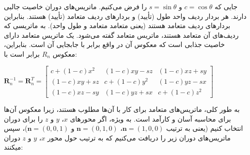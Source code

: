 {\begin{spacing}{1.5}
        جایی که $c=\cos\theta$ و $s=\sin\theta$ را فرض می‌کنیم.
        ماتریس‌های دوران خاصیت جالبی دارند. هر بردار ردیف واحد طول (تأیید) و بردارهای ردیف متعامد (تأیید) هستند.
        بنابراین بردارهای ردیف متعامد هستند (یعنی متعامد متعامد و طول واحد).
        به ماتریسی که ردیف‌های آن متعامد هستند، ماتریس متعامد گفته می‌شود.
        یک ماتریس متعامد دارای خاصیت جذابی است که معکوس آن در واقع برابر با جابجایی آن است. بنابراین، معکوس $R_{n}$ برابر است با:

        \begin{center}
            $\textbf{R}^{-1}_{n}=\textbf{R}^{T}_{n}=\begin{bmatrix}
                                                        c+(1-c)x^{2} & (1-c)xy-sz   & (1-c)xz+sy \\
                                                        (1-c)xy+sz   & c+(1-c)y^{2} & (1-c)yz-sx \\
                                                        (1-c)xz-sy   & (1-c)yz+sx   & c+(1-c)z^{2}
            \end{bmatrix}$
        \end{center}

        به طور کلی، ماتریس‌های متعامد برای کار با آن‌ها مطلوب هستند، زیرا معکوس آن‌ها برای محاسبه آسان و کارآمد است.
        به ویژه، اگر محورهای $x$، $y$ و $z$ را برای دوران انتخاب کنیم (یعنی به ترتیب $\textbf{n}=(1,0,0)$، $\textbf{n}=(0,1,0)$ و $\textbf{n}=(0,0,1)$)،
        سپس ماتریس‌های دوران زیر را دریافت می‌کنیم که به ترتیب حول محور $x$، $y$ و $z$ دوران میکنند:


\end{spacing}}
